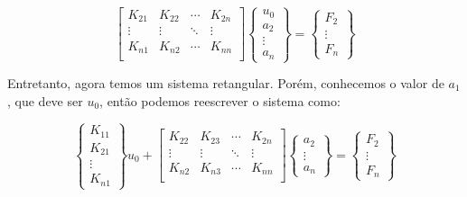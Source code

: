         \begin{equation*}
            \begin{bmatrix}
                K_{21} & K_{22} & \cdots & K_{2n}\\
                \vdots & \vdots & \ddots & \vdots\\
                K_{n1} & K_{n2} & \cdots & K_{nn}\\
            \end{bmatrix}
            \begin{Bmatrix}
                u_0\\
                a_2 \\
                \vdots\\
                a_n
            \end{Bmatrix}
            =
             \begin{Bmatrix}
                F_2\\
                \vdots\\
                F_n
            \end{Bmatrix}
        \end{equation*}

        Entretanto, agora temos um sistema retangular. Porém, conhecemos o valor de $a_1$, que deve ser $u_0$, então podemos reescrever o sistema como:

        \begin{equation*}
            \begin{Bmatrix}
                K_{11}\\
                K_{21} \\
                \vdots\\
                K_{n1}
            \end{Bmatrix}
            u_0
            +
            \begin{bmatrix}
                K_{22} & K_{23} & \cdots & K_{2n}\\
                \vdots & \vdots & \ddots & \vdots\\
                K_{n2} & K_{n3} & \cdots & K_{nn}\\
            \end{bmatrix}
            \begin{Bmatrix}
                a_2 \\
                \vdots\\
                a_n
            \end{Bmatrix}
            =
             \begin{Bmatrix}
                F_2\\
                \vdots\\
                F_n
            \end{Bmatrix}
        \end{equation*}

